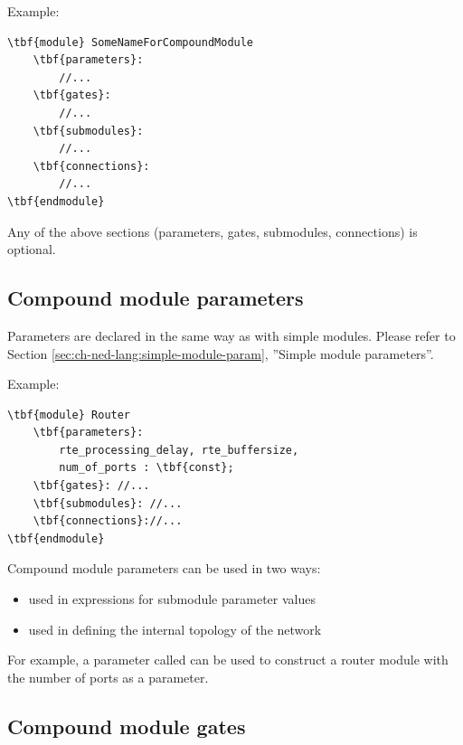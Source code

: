 Example:

\begin{Verbatim}[commandchars=\\\{\}]
\tbf{module} SomeNameForCompoundModule
    \tbf{parameters}:
        //...
    \tbf{gates}:
        //...
    \tbf{submodules}:
        //...
    \tbf{connections}:
        //...
\tbf{endmodule}
\end{Verbatim}

Any of the above sections (parameters, gates, submodules, connections) 
is optional.





\subsection{Compound module parameters}


Parameters are declared in the same
way as with simple modules.  Please refer to
Section \ref{sec:ch-ned-lang:simple-module-param}, ''Simple module
parameters''.


Example:

\begin{Verbatim}[commandchars=\\\{\}]
\tbf{module} Router
    \tbf{parameters}:
        rte_processing_delay, rte_buffersize,
        num_of_ports : \tbf{const};
    \tbf{gates}: //...
    \tbf{submodules}: //...
    \tbf{connections}://...
\tbf{endmodule}
\end{Verbatim}

Compound module parameters can be used in two ways:
\begin{itemize}
\item{used in expressions for submodule parameter values}
\item{used in defining the internal topology of the network}
\end{itemize}

For example, a parameter called  can be used to 
construct a router module with the number of ports as a parameter.





\subsection{Compound module gates}




